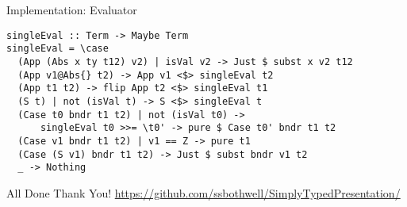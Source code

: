 \documentclass[presentation]{beamer}
\begin{document}
\begin{frame}[label={sec:org2dfabf5},fragile]{Implementation: Evaluator}
 \begin{verbatim}
singleEval :: Term -> Maybe Term
singleEval = \case
  (App (Abs x ty t12) v2) | isVal v2 -> Just $ subst x v2 t12
  (App v1@Abs{} t2) -> App v1 <$> singleEval t2
  (App t1 t2) -> flip App t2 <$> singleEval t1
  (S t) | not (isVal t) -> S <$> singleEval t
  (Case t0 bndr t1 t2) | not (isVal t0) -> 
      singleEval t0 >>= \t0' -> pure $ Case t0' bndr t1 t2
  (Case v1 bndr t1 t2) | v1 == Z -> pure t1
  (Case (S v1) bndr t1 t2) -> Just $ subst bndr v1 t2
  _ -> Nothing
\end{verbatim}
\end{frame}
\begin{frame}[label={sec:org8054a0c}]{All Done}
\center
Thank You!
\url{https://github.com/ssbothwell/SimplyTypedPresentation/}
\end{frame}
\end{document}
